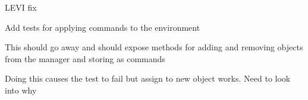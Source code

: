 
\begin{DoxyRefList}
\item[Member \mbox{\hyperlink{tesseract__ignition__visualization_8cpp_a010c518967207c53ba30ab4b7cdd26fa}{add\+Cylinder}} (Entity\+Manager \&entity\+\_\+manager, ignition\+::msgs\+::\+Link \&link, long \&sub\+\_\+index, const Eigen\+::\+Ref$<$ const Eigen\+::\+Vector3d $>$ \&pt1, const Eigen\+::\+Ref$<$ const Eigen\+::\+Vector3d $>$ \&pt2, const \mbox{\hyperlink{classtesseract__scene__graph_1_1Material}{tesseract\+\_\+scene\+\_\+graph\+::\+Material}} \&material, const Eigen\+::\+Vector3d \&)]\label{todo__todo000004}%
%
LEVI fix  
\item[Member \mbox{\hyperlink{tesseract__environment__unit_8cpp_a7efd38cb7d246fd917d0181cc944ec94}{run\+Apply\+Commands\+Test}} ()]\label{todo__todo000002}%
%
Add tests for applying commands to the environment  
\item[Member \mbox{\hyperlink{classtesseract__environment_1_1Environment_a7f10ded105cbd32151631123466f8fbd}{tesseract\+\_\+environment\+::Environment\+::get\+Manipulator\+Manager}} ()]\label{todo__todo000001}%
%
This should go away and should expose methods for adding and removing objects from the manager and storing as commands  
\item[Member \mbox{\hyperlink{tesseract__scene__graph__unit_8cpp_a07e5d7fb0413d0780df4b637bcd35845}{TEST}} (Tesseract\+Scene\+Graph\+Unit, Tesseract\+Scene\+Graph\+Remove\+Link\+Unit)]\label{todo__todo000003}%
%
Doing this causes the test to fail but assign to new object works. Need to look into why 
\end{DoxyRefList}